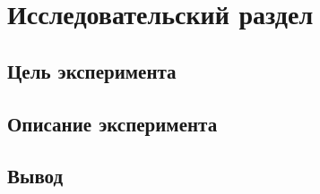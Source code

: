 \chapter{Исследовательский раздел}\label{sec:exp}

\section{Цель эксперимента}
\section{Описание эксперимента}
\section{Вывод}